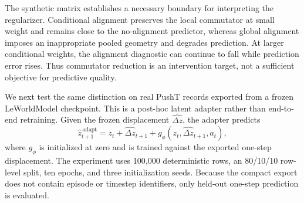 \documentclass{article}
\begin{document}
The synthetic matrix establishes a necessary boundary for interpreting the
regularizer. Conditional alignment preserves the local commutator at small
weight and remains close to the no-alignment predictor, whereas global
alignment imposes an inappropriate pooled geometry and degrades prediction.
At larger conditional weights, the alignment diagnostic can continue to fall
while prediction error rises. Thus commutator reduction is an intervention
target, not a sufficient objective for predictive quality.

We next test the same distinction on real PushT records exported from a frozen
LeWorldModel checkpoint. This is a post-hoc latent adapter rather than
end-to-end retraining. Given the frozen displacement $\widehat{\Delta z}$, the
adapter predicts
\begin{equation}
\widehat z_{t+1}^{\,\mathrm{adapt}} = z_t + \widehat{\Delta z}_{t+1} + g_\phi\!\left(z_t,\widehat{\Delta z}_{t+1},a_t\right),
\label{eq:supp-latent-adapter}
\end{equation}
where $g_\phi$ is initialized at zero and is trained against the exported
one-step displacement. The experiment uses 100,000 deterministic rows, an
80/10/10 row-level split, ten epochs, and three initialization seeds. Because
the compact export does not contain episode or timestep identifiers, only
held-out one-step prediction is evaluated.

\begin{table}[H]
\centering
\small
\setlength{\tabcolsep}{3pt}
\caption{Frozen PushT latent-adapter intervention. The frozen row is the
released predictor without an adapter; all other rows are the same learned
residual adapter with the indicated alignment penalty. Paired MSE deltas are
computed within seed relative to the no-alignment adapter.}
\label{tab:supp-real-intervention}
\end{table}
\end{document}
